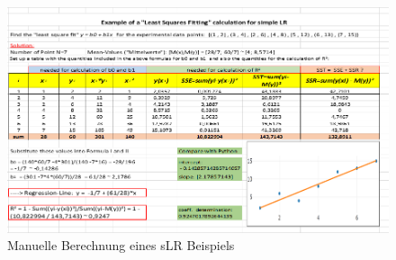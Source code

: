 \documentclass[12pt]{article}
\begin{document}
\begin{figure}[htp]
  \centering
  \hspace*{-0.9cm} 
  \includegraphics[width=1.25 \textwidth]{Einfaches-sLR_Beispiel}
  \caption{Manuelle Berechnung eines sLR Beispiels}
  \label{fig:einfaches-sLR-Bsp}
\end{figure}
%
\newpage
\end{document}
